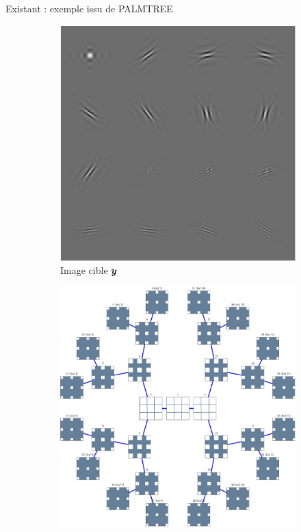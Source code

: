 \begin{frame}{Existant : exemple issu de PALMTREE}
\begin{figure}[!ht]\centering
\begin{subfigure}[b]{0.30\textwidth}\centering
	\includegraphics[width=\textwidth]{figures-masters-thesis/tree-learn-setup/target.pdf}
	\caption{Image cible $\bm{y}$}
\end{subfigure}
\begin{subfigure}[b]{0.30\textwidth}\centering
	\includegraphics[width=\textwidth]{figures-masters-thesis/tree-learn-setup/xp_learnsupp256_curvelet_decomp3[tree-binary_dpth4]_supp-generic3x3_[fixed-supports]_tree.pdf}

\end{subfigure}
\end{figure}
\end{frame}
